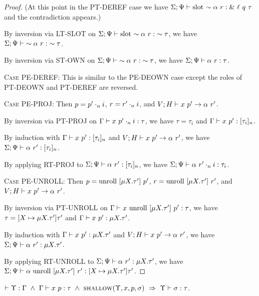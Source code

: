 \documentclass{article}
\begin{document}
\begin{proof}
    (At this point in the \textsc{PT-DEREF} case we have 
    ${{\Sigma} ;{\Psi}} \vdash {{\textrm{slot}\ {\sim {{\alpha}\ {r}}}}} : {{\&\ {\ell}\ {q}\ {\tau}}}$
    and the contradiction appears.)

    By inversion via \textsc{LT-SLOT} on
    ${{\Sigma} ;{\Psi}} \vdash {{\textrm{slot}\ {\sim {{\alpha}\ {r}}}}} : {{\sim {\tau}}}$, we have
    ${{\Sigma} ;{\Psi}} \vdash {{\sim {{\alpha}\ {r}}}} : {{\sim {\tau}}}$.

    By inversion via \textsc{ST-OWN} on
    ${{\Sigma} ;{\Psi}} \vdash {{\sim {{\alpha}\ {r}}}} : {{\sim {\tau}}}$, we have
    ${{{\Sigma}} ;{{\Psi}}} \vdash {{{\alpha}\ {r}}} : {{{\tau}}}$.

    \textsc{Case PE-DEREF}: 
      This is similar to the \textsc{PE-DEOWN} case except the roles of
      \textsc{PT-DEOWN} and \textsc{PT-DEREF} are reversed.

  \textsc{Case PE-PROJ}:
    Then $p = {p'}\cdot_{n} {i}$, $r = {r'}\cdot_{n} {i}$, and ${{V};{H}} \vdash {{x}\ {p'}} \rightarrow {{\alpha}\ {r'}}$.

    By inversion via \textsc{PT-PROJ} on ${{\Gamma}} \vdash {{x}\ {{p'}\cdot_{n} {i}}} : {{\tau}}$,
    we have $\tau = \tau_i$ and ${{\Gamma}} \vdash {{x}\ {p'}} : {{[ {\tau_i} ]_{n}}}$.

    By induction with ${{\Gamma}} \vdash {{x}\ {p'}} : {{[ {\tau_i} ]_{n}}}$
    and ${{V};{H}} \vdash {{x}\ {p'}} \rightarrow {{\alpha}\ {r'}}$,
    we have ${{{\Sigma}} ;{{\Psi}}} \vdash {{{\alpha}\ {r'}}} : {{{[ {\tau_i} ]_{n}}}}$.

    By applying \textsc{RT-PROJ} to ${{{\Sigma}} ;{{\Psi}}} \vdash {{{\alpha}\ {r'}}} : {{{[ {\tau_i} ]_{n}}}}$,
    we have ${{{\Sigma}} ;{{\Psi}}} \vdash {{{\alpha}\ {{r'}\cdot_{n} {i}}}} : {{{\tau_i}}}$.

  \textsc{Case PE-UNROLL}:
    Then $p = \textrm{unroll}\ [{\mu {X}.{\tau'}}]\ {p'}$, $r = \textrm{unroll}\ [{\mu {X}.{\tau'}}]\ {r'}$,
    and ${{V};{H}} \vdash {{x}\ {p'}} \rightarrow {{\alpha}\ {r'}}$.

    By inversion via \textsc{PT-UNROLL} on ${{\Gamma}} \vdash {{x}\ {\textrm{unroll}\ [{\mu {X}.{\tau'}}]\ {p'}}} : {{\tau}}$,
    we have $\tau = [{X} \mapsto {\mu {X}.{\tau'}}]{\tau'}$ and ${{\Gamma}} \vdash {{x}\ {p'}} : {{\mu {X}.{\tau'}}}$.

    By induction with ${{\Gamma}} \vdash {{x}\ {p'}} : {{\mu {X}.{\tau'}}}$ and ${{V};{H}} \vdash {{x}\ {p'}} \rightarrow {{\alpha}\ {r'}}$,
    we have ${{{\Sigma}} ;{{\Psi}}} \vdash {{{\alpha}\ {r'}}} : {{{\mu {X}.{\tau'}}}}$.

    By applying \textsc{RT-UNROLL} to ${{{\Sigma}} ;{{\Psi}}} \vdash {{{\alpha}\ {r'}}} : {{{\mu {X}.{\tau'}}}}$,
    we have
    ${{{\Sigma}} ;{{\Psi}}} \vdash {{{\alpha}\ {\textrm{unroll}\ [{\mu {X}.{\tau'}}]\ {r'}}}} : {{{[{X} \mapsto {\mu {X}.{\tau'}}]{\tau'}}}}$.
\end{proof}

\begin{lem}
  $\YWF{\Upsilon}{\Gamma}\ \land\ \PType{\Gamma}{x}{p}{\tau}\ \land\
   \Shallow{\Upsilon}{x}{p}{\sigma}\ \Rightarrow\ \Type{\Upsilon}{\sigma}{\tau}$.
\end{lem}
\end{document}
